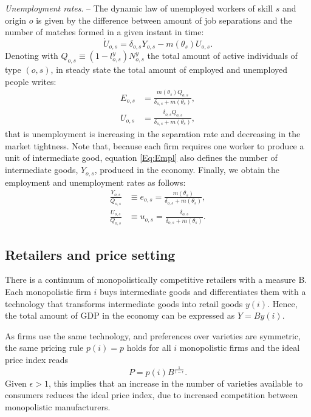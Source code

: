 \documentclass[a4paper,12pt]{article}
\begin{document}
\emph{Unemployment rates}. -- 
The dynamic law of unemployed workers of skill $s$ and origin $o$ is given
by the difference between amount of job separations and the number of matches
formed in a given instant in time: 
\begin{equation*}
\dot{U}_{o,s}=\delta _{o,s}Y_{o,s}-m\left( \theta _{s}\right) U_{o,s}.
\end{equation*}
Denoting with $Q_{o,s}\equiv (1-l^y_{o,s}) N^y_{o,s}$ the total amount of active
individuals of type $(o,s)$, in steady state the total amount of employed
and unemployed people writes: 
\begin{align}
E_{o,s}& =\frac{m\left( \theta _{s}\right) Q_{o,s}}{\delta _{o,s}+m\left(
\theta _{s}\right) },  \label{Eq:Empl} \\
U_{o,s}& =\frac{\delta _{o,s} Q_{o,s}}{\delta _{o,s}+m\left( \theta
_{s}\right) },  \label{Eq:Unempl}
\end{align}%
that is unemployment is increasing in the separation rate and decreasing in
the market tightness. Note that, because each firm requires one worker to produce a unit of intermediate good, equation \eqref{Eq:Empl} also defines the number of intermediate goods, $Y_{o,s}$, produced in the economy. Finally, we obtain the employment and unemployment
rates as follows: 
\begin{align}
\frac{Y_{o,s}}{Q_{o,s}} & \equiv e_{o,s}=\frac{m \left( \theta_{s} \right)}{\delta_{o,s} +m \left(\theta _{s}\right)},  \label{Eq:OptEmp} \\
\frac{U_{o,s}}{Q_{o,s}} & \equiv u_{o,s}=\frac{\delta _{o,s}}{\delta_{o,s}+m \left( \theta _{s} \right) }.  \label{Eq:OptUnemp}
\end{align}

\subsection{Retailers and price setting} \label{retail_market}

There is a continuum of monopolistically competitive retailers with a
measure B. Each monopolistic firm $i$ buys intermediate goods and
differentiates them with a technology that transforms intermediate goods into
retail goods $y(i)$. Hence, the total amount of GDP in the economy can be
expressed as $Y=By(i)$.

As firms use the same technology, and preferences over varieties are
symmetric, the same pricing rule $p(i) = p$ holds for all $i$ monopolistic
firms and the ideal price index reads
\begin{equation}
\label{P}
P=p(i) B^{\frac{1}{1-\epsilon}}.
\end{equation}
Given $\epsilon > 1$, this implies that an increase in the number of varieties
available to consumers reduces the ideal price index, due to increased
competition between monopolistic manufacturers.
\end{document}
